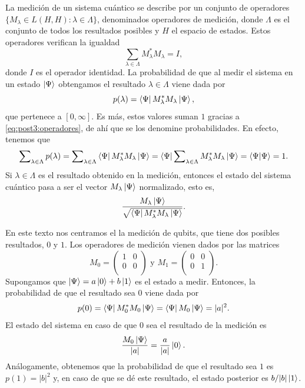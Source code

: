 \documentclass{article}
\begin{document}
\begin{postulate}[Medición] \label{post:3}
La medición de un sistema cuántico se describe por un conjunto de operadores $\{M_\lambda \in L(H,H) : \lambda \in \Lambda \}$, denominados operadores de medición, donde $\Lambda$ es el conjunto de todos los resultados posibles y $H$ el espacio de estados. Estos operadores verifican la igualdad 
\begin{equation} \label{eq:post3:operadores}
  \sum_{\lambda \in \Lambda} M_\lambda^* M_\lambda = I,
\end{equation}
donde $I$ es el operador identidad. La probabilidad de que al medir el sistema en un estado $\ket{\Psi}$ obtengamos el resultado $\lambda \in \Lambda$ viene dada por
\begin{equation} \label{eq:post3:prob}
  p(\lambda) = \bra{\Psi}M_\lambda^* M_\lambda \ket{\Psi},
\end{equation}
que pertenece a $[0,\infty]$. Es más, estos valores suman $1$ gracias a \eqref{eq:post3:operadores}, de ahí que se los denomine probabilidades. En efecto, tenemos que
\begin{equation*} \label{eq:post3:1}
  \sum\nolimits_{\lambda \in \Lambda} p(\lambda) = \sum\nolimits_{\lambda \in \Lambda} \bra{\Psi} M_\lambda^* M_\lambda \ket{\Psi} = \bra{\Psi} \sum\nolimits_{\lambda \in \Lambda} M_\lambda^* M_\lambda \ket{\Psi} = \bra{\Psi}\ket{\Psi} = 1.
\end{equation*}
Si $\lambda \in \Lambda$ es el resultado obtenido en la medición, entonces el estado del sistema cuántico pasa a ser el vector $M_\lambda \ket{\Psi}$ normalizado, esto es,
\begin{equation*} \label{eq:post3:estado}
 \frac{M_\lambda \ket{\Psi}}{\sqrt{\bra{\Psi}M_\lambda^* M_\lambda \ket{\Psi}}}.
\end{equation*}
\end{postulate}

En este texto nos centramos el la medición de qubits, que tiene dos posibles resultados, $0$ y $1$. Los operadores de medición vienen dados por las matrices
  \[ M_0 = 
     \left(
     \begin{matrix}
       1 & 0 \\
       0 & 0 \\
      \end{matrix} 
     \right)
     \text{ y }
     M_1 =
     \left(\begin{matrix}
       0 & 0 \\
       0 & 1 \\
     \end{matrix}
     \right).
  \]
  Supongamos que $\ket{\Psi} = a \ket{0} + b \ket{1}$ es el estado a medir. Entonces, la probabilidad de que el resultado sea $0$ viene dada por
  \[ p(0) =  \bra{\Psi} M_0^* M_0 \ket{\Psi} = \bra{\Psi} M_0 \ket{\Psi} = |a|^2. \]
  El estado del sistema en caso de que $0$ sea el resultado de la medición es
  \[ \frac{M_0 \ket{\Psi}}{|a|} = \frac{a}{|a|} \ket{0}.\]
  Análogamente, obtenemos que la probabilidad de que el resultado sea $1$ es $p(1) = |b|^2$ y, en caso de que se dé este resultado, el estado posterior es $b/|b| \ket{1}$.
  
\end{document}
